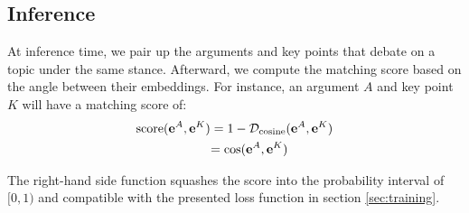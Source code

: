 \subsection{Inference}
At inference time, we pair up the arguments and key points that debate on a topic under the same stance. Afterward, we compute the matching score based on the angle between their embeddings. For instance, an argument $A$ and key point $K$ will have a matching score of:
\begin{align*}
\mathrm{score}(\mathbf{e}^A, \mathbf{e}^K) = 1 - \mathcal{D}_{\mathrm{cosine}}(\mathbf{e}^A, \mathbf{e}^K)\\
= \mathrm{cos}(\mathbf{e}^A, \mathbf{e}^K)\hspace*{12.5mm}
\end{align*}

The right-hand side function squashes the score into the probability interval of $[0,1)$ and compatible with the presented loss function in section \ref{sec:training}.